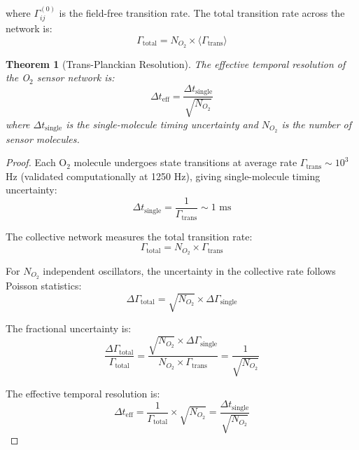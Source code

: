 \documentclass[twocolumn,10pt,aps,prd,superscriptaddress,floatfix,nofootinbib]{revtex4-2}
\newtheorem{theorem}{Theorem}[section]
\theoremstyle{remark}
\begin{document}
where $\Gamma_{ij}^{(0)}$ is the field-free transition rate. The total transition rate across the network is:
\begin{equation}
\Gamma_{\mathrm{total}} = N_{O_2} \times \langle \Gamma_{\mathrm{trans}} \rangle
\label{eq:total_rate}
\end{equation}

\begin{theorem}[Trans-Planckian Resolution]
\label{thm:transplanckian}
The effective temporal resolution of the O$_2$ sensor network is:
\begin{equation}
\Delta t_{\mathrm{eff}} = \frac{\Delta t_{\mathrm{single}}}{\sqrt{N_{O_2}}}
\label{eq:transplanckian_resolution}
\end{equation}
where $\Delta t_{\mathrm{single}}$ is the single-molecule timing uncertainty and $N_{O_2}$ is the number of sensor molecules.
\end{theorem}

\begin{proof}
Each O$_2$ molecule undergoes state transitions at average rate $\Gamma_{\mathrm{trans}} \sim 10^3$ Hz (validated computationally at 1250 Hz), giving single-molecule timing uncertainty:
\begin{equation}
\Delta t_{\mathrm{single}} = \frac{1}{\Gamma_{\mathrm{trans}}} \sim 1 \text{ ms}
\end{equation}

The collective network measures the total transition rate:
\begin{equation}
\Gamma_{\mathrm{total}} = N_{O_2} \times \Gamma_{\mathrm{trans}}
\end{equation}

For $N_{O_2}$ independent oscillators, the uncertainty in the collective rate follows Poisson statistics:
\begin{equation}
\Delta\Gamma_{\mathrm{total}} = \sqrt{N_{O_2}} \times \Delta\Gamma_{\mathrm{single}}
\end{equation}

The fractional uncertainty is:
\begin{equation}
\frac{\Delta\Gamma_{\mathrm{total}}}{\Gamma_{\mathrm{total}}} = \frac{\sqrt{N_{O_2}} \times \Delta\Gamma_{\mathrm{single}}}{N_{O_2} \times \Gamma_{\mathrm{trans}}} = \frac{1}{\sqrt{N_{O_2}}}
\end{equation}

The effective temporal resolution is:
\begin{equation}
\Delta t_{\mathrm{eff}} = \frac{1}{\Gamma_{\mathrm{total}}} \times \sqrt{N_{O_2}} = \frac{\Delta t_{\mathrm{single}}}{\sqrt{N_{O_2}}}
\end{equation}
\end{proof}
\end{document}
